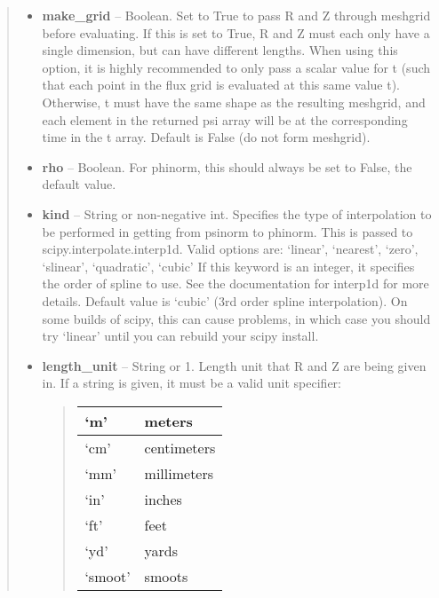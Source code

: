 \documentclass[letterpaper,10pt,english]{sphinxmanual}
\begin{document}
\begin{fulllineitems}
\begin{fulllineitems}
\begin{quote}
\begin{description}
\begin{itemize}
\item {} 
\textbf{make\_grid} --
Boolean. Set to True to pass R and Z through meshgrid
before evaluating. If this is set to True, R and Z must each
only have a single dimension, but can have different lengths.
When using this option, it is highly recommended to only pass
a scalar value for t (such that each point in the flux grid is
evaluated at this same value t). Otherwise, t must have the
same shape as the resulting meshgrid, and each element in the
returned psi array will be at the corresponding time in the t
array. Default is False (do not form meshgrid).

\item {} 
\textbf{rho} --
Boolean. For phinorm, this should always be set to False, the
default value.

\item {} 
\textbf{kind} --
String or non-negative int. Specifies the type of interpolation
to be performed in getting from psinorm to phinorm. This is
passed to scipy.interpolate.interp1d. Valid options are:
`linear', `nearest', `zero', `slinear', `quadratic', `cubic'
If this keyword is an integer, it specifies the order of spline
to use. See the documentation for interp1d for more details.
Default value is `cubic' (3rd order spline interpolation). On
some builds of scipy, this can cause problems, in which case
you should try `linear' until you can rebuild your scipy install.

\item {} 
\textbf{length\_unit} --
String or 1. Length unit that R and Z are being given
in. If a string is given, it must be a valid unit specifier:
\begin{quote}

\begin{tabulary}{\linewidth}{|L|L|}
\hline

`m'
 & 
meters
\\\hline

`cm'
 & 
centimeters
\\\hline

`mm'
 & 
millimeters
\\\hline

`in'
 & 
inches
\\\hline

`ft'
 & 
feet
\\\hline

`yd'
 & 
yards
\\\hline

`smoot'
 & 
smoots
\\\hline


\end{tabulary}
\end{quote}
\end{itemize}
\end{description}
\end{quote}
\end{fulllineitems}
\end{fulllineitems}
\end{document}
